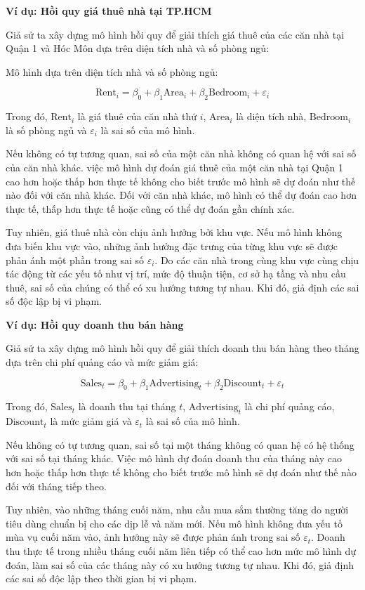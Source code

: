 \documentclass[12pt,a4paper]{article}
\begin{document}
\textbf{Ví dụ: Hồi quy giá thuê nhà tại TP.HCM}

Giả sử ta xây dựng mô hình hồi quy để giải thích giá thuê của các căn nhà tại Quận 1 và Hóc Môn dựa trên diện tích nhà và số phòng ngủ:

Mô hình dựa trên diện tích nhà và số phòng ngủ:

\[
\mathrm{Rent}_i
=
\beta_0
+
\beta_1 \mathrm{Area}_i
+
\beta_2 \mathrm{Bedroom}_i
+
\varepsilon_i
\]

Trong đó, $\mathrm{Rent}_i$ là giá thuê của căn nhà thứ $i$,
$\mathrm{Area}_i$ là diện tích nhà,
$\mathrm{Bedroom}_i$ là số phòng ngủ
và $\varepsilon_i$ là sai số của mô hình.

Nếu không có tự tương quan, sai số của một căn nhà không có quan hệ với sai số của căn nhà khác. việc mô hình dự đoán giá thuê của một căn nhà tại Quận 1 cao hơn hoặc thấp hơn thực tế không cho biết trước mô hình sẽ dự đoán như thế nào đối với căn nhà khác. Đối với căn nhà khác, mô hình có thể dự đoán cao hơn thực tế, thấp hơn thực tế hoặc cũng có thể dự đoán gần chính xác.

Tuy nhiên, giá thuê nhà còn chịu ảnh hưởng bởi khu vực. Nếu mô hình không đưa biến khu vực vào, những ảnh hưởng đặc trưng của từng khu vực sẽ được phản ánh một phần trong sai số $\varepsilon_i$. Do các căn nhà trong cùng khu vực cùng chịu tác động từ các yếu tố như vị trí, mức độ thuận tiện, cơ sở hạ tầng và nhu cầu thuê, sai số của chúng có thể có xu hướng tương tự nhau. Khi đó, giả định các sai số độc lập bị vi phạm.

\textbf{Ví dụ: Hồi quy doanh thu bán hàng}

Giả sử ta xây dựng mô hình hồi quy để giải thích doanh thu bán hàng theo tháng dựa trên chi phí quảng cáo và mức giảm giá:

\[
\mathrm{Sales}_t
=
\beta_0
+
\beta_1 \mathrm{Advertising}_t
+
\beta_2 \mathrm{Discount}_t
+
\varepsilon_t
\]

Trong đó, $\mathrm{Sales}_t$ là doanh thu tại tháng $t$, $\mathrm{Advertising}_t$ là chi phí quảng cáo, $\mathrm{Discount}_t$ là mức giảm giá và $\varepsilon_t$ là sai số của mô hình.

Nếu không có tự tương quan, sai số tại một tháng không có quan hệ có hệ thống với sai số tại tháng khác. Việc mô hình dự đoán doanh thu của tháng này cao hơn hoặc thấp hơn thực tế không cho biết trước mô hình sẽ dự đoán như thế nào đối với tháng tiếp theo.

Tuy nhiên, vào những tháng cuối năm, nhu cầu mua sắm thường tăng do người tiêu dùng chuẩn bị cho các dịp lễ và năm mới. Nếu mô hình không đưa yếu tố mùa vụ cuối năm vào, ảnh hưởng này sẽ được phản ánh trong sai số $\varepsilon_t$. Doanh thu thực tế trong nhiều tháng cuối năm liên tiếp có thể cao hơn mức mô hình dự đoán, làm sai số của các tháng này có xu hướng tương tự nhau. Khi đó, giả định các sai số độc lập theo thời gian bị vi phạm.
\end{document}
